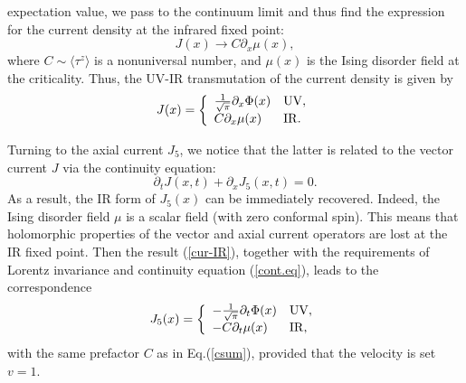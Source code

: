 expectation value, we pass to the continuum limit and thus find the expression
for the current density at the infrared fixed point:
\begin{equation}
J (x) \to C \partial_x \mu (x),
\label{cur-IR}
\end{equation}
where $C \sim \langle \tau^z\rangle$ is a nonuniversal number,
and $\mu (x)$ is the Ising disorder field
at the criticality. Thus, the UV-IR transmutation of the current density
is given by
\begin{equation}
J(x)=
\left\{
\displaystyle
\begin{array}{ll}
\frac{1}{\sqrt{\pi}}\partial_x\Phi(x) & {\rm UV},\\
C\partial_x\mu(x) & {\rm IR}.
\end{array}
\right.
\label{csum}
\end{equation}

Turning to the axial current $J_5$, we notice that
the latter is related to
the vector current $J$ via the continuity equation:
\begin{equation}
\partial_t J(x,t) + \partial_x J_5 (x,t) = 0. \label{cont.eq}
\end{equation}
As a result, the IR form of $J_5(x)$ can be immediately recovered. Indeed,
the Ising disorder field $\mu$ is a scalar field (with zero conformal spin).
This means that holomorphic properties of the vector and axial current operators
are lost at the IR fixed point. Then the result
(\ref{cur-IR}), together with the
requirements of Lorentz invariance and continuity equation (\ref{cont.eq}),
leads to the correspondence
\begin{equation}
J_5 (x)=
\left\{
\displaystyle
\begin{array}{ll}
- \frac{1}{\sqrt{\pi}}\partial_t\Phi(x) & {\rm UV},\\
- C\partial_t\mu(x) & {\rm IR},
\end{array}
\right.
\label{c5sum}
\end{equation}
with the same prefactor $C$ as in Eq.(\ref{csum}), provided that
the velocity is set $v = 1$.

